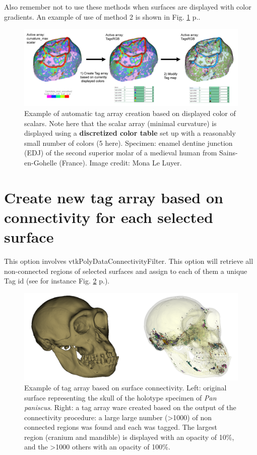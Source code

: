 Also remember not to use these methods when surfaces are displayed with color gradients. An example of use of method 2 is shown in Fig. \ref{rgb_conversion_example} p.\pageref{rgb_conversion_example}.


\begin{figure}
  \centering
  \includegraphics[scale=0.2]{images/12/tags_from_rgb_example.png} 
	\caption{Example of automatic tag array creation based on displayed color of scalars. Note here that the scalar array (minimal curvature) is displayed using a \textbf{discretized color table} set up with a reasonably small number of colors (5 here). Specimen: enamel dentine junction (EDJ) of the second superior molar of a medieval human from Sains-en-Gohelle (France). Image credit: Mona Le Luyer.}
\label{rgb_conversion_example}
\end{figure}


\section{Create new tag array based on connectivity for each selected surface}

This option involves vtkPolyDataConnectivityFilter. This option will retrieve all non-connected regions of selected surfaces and assign to each of them a unique Tag id (see for instance Fig. \ref{tag_connected} p.\pageref{tag_connected}).
\begin{figure}
  \centering
  \includegraphics[scale=0.28]{images/12/connectivity_tags.png} 
	\caption{Example of tag array based on surface connectivity. Left: original surface representing the skull of the holotype specimen of \textit{Pan paniscus}. Right: a tag array ware created based on the output of the connectivity procedure: a large large number (>1000) of non connected regions was found and each was tagged. The largest region (cranium and mandible) is displayed with an opacity of 10\%, and the >1000 others with an opacity of 100\%. }
\label{tag_connected}
 
\end{figure}


